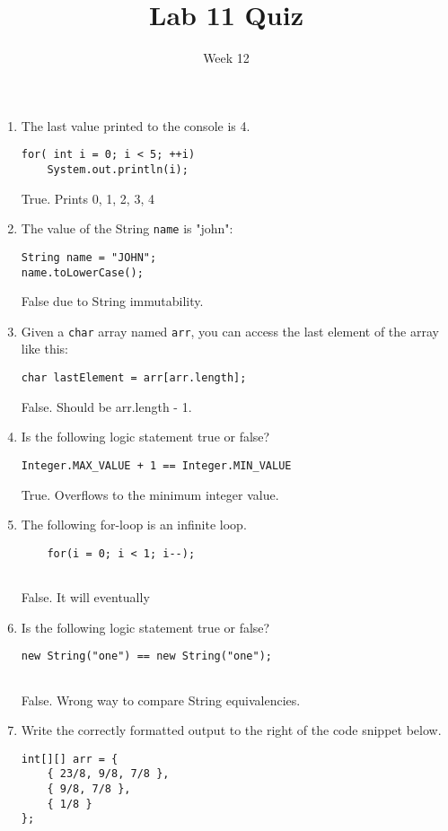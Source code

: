 \documentclass[12pt]{article}
\title{Lab 11 Quiz}
\date{Week 12}
\begin{document}
 

\Instructions

\begin{enumerate}

\item {} \tf
The last value printed to the console is 4.
\begin{lstlisting}
for( int i = 0; i < 5; ++i)
    System.out.println(i);
\end{lstlisting}
\Ans True. Prints 0, 1, 2, 3, 4

 \item {} \tf
The value of the String \texttt{name} is "john":
\begin{lstlisting}
String name = "JOHN";
name.toLowerCase();
\end{lstlisting}

\Ans False due to String immutability.
\item {} \tf Given a \texttt{char} array named \texttt{arr}, you can access the last element of the array like this:
\begin{lstlisting}
char lastElement = arr[arr.length];
\end{lstlisting}

\Ans False. Should be arr.length - 1.

\item {} \tf Is the following logic statement true or false?
\begin{lstlisting}
Integer.MAX_VALUE + 1 == Integer.MIN_VALUE

\end{lstlisting}
\Ans True. Overflows to the minimum integer value.

\item {} \tf The following for-loop is an infinite loop.

\begin{lstlisting}
	for(i = 0; i < 1; i--);
	
\end{lstlisting}

\Ans False. It will eventually

\item {} \tf Is the following logic statement true or false?
\begin{lstlisting}
new String("one") == new String("one");


\end{lstlisting}
\Ans False. Wrong way to compare String equivalencies.
\clearpage
\item {} Write the correctly formatted output to the right of the code snippet below.
\begin{lstlisting}
int[][] arr = {
	{ 23/8, 9/8, 7/8 },
	{ 9/8, 7/8 },
	{ 1/8 }
};


\end{lstlisting}
\end{enumerate}
\end{document}
